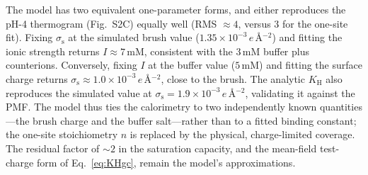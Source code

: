 \documentclass[11pt]{article}
\begin{document}
The model has two equivalent one-parameter forms, and either reproduces the pH-4
thermogram (Fig.~S2C) equally well (RMS $\approx4$, versus $3$ for the one-site
fit).  Fixing $\sigma_\text{s}$ at the simulated brush value
($1.35\times10^{-3}\,e$\,\AA$^{-2}$) and fitting the ionic strength returns
$I\approx7$\,mM, consistent with the $3$\,mM buffer plus counterions.
Conversely, fixing $I$ at the buffer value ($5$\,mM) and fitting the surface
charge returns $\sigma_\text{s}\approx1.0\times10^{-3}\,e$\,\AA$^{-2}$, close to
the brush.  The analytic $K_\text{H}$ also reproduces the simulated value at
$\sigma_\text{s}=1.9\times10^{-3}\,e$\,\AA$^{-2}$, validating it against the PMF.
The model thus ties the calorimetry to two independently known quantities---the
brush charge and the buffer salt---rather than to a fitted binding constant; the
one-site stoichiometry $n$ is replaced by the physical, charge-limited coverage.
The residual factor of $\sim\!2$ in the saturation capacity, and the mean-field
test-charge form of Eq.~\ref{eq:KHgc}, remain the model's approximations.
\end{document}

